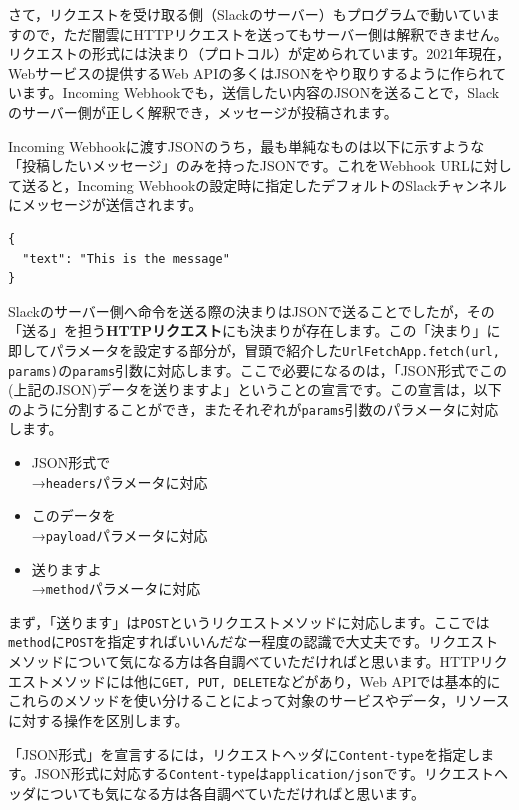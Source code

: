 \documentclass[uplatex,a4j]{jsarticle}
\begin{document}
さて，リクエストを受け取る側（Slackのサーバー）もプログラムで動いていますので，ただ闇雲にHTTPリクエストを送ってもサーバー側は解釈できません。リクエストの形式には決まり（プロトコル）が定められています。2021年現在，Webサービスの提供するWeb APIの多くはJSONをやり取りするように作られています。Incoming Webhookでも，送信したい内容のJSONを送ることで，Slackのサーバー側が正しく解釈でき，メッセージが投稿されます。


Incoming Webhookに渡すJSONのうち，最も単純なものは以下に示すような「投稿したいメッセージ」のみを持ったJSONです。これをWebhook URLに対して送ると，Incoming Webhookの設定時に指定したデフォルトのSlackチャンネルにメッセージが送信されます。
\begin{lstlisting}[basicstyle=\ttfamily\footnotesize,frame=single,caption=Minimum JSON payload for Incoming Webhook,label=jsonpayload]
{
  "text": "This is the message"
}
\end{lstlisting}

Slackのサーバー側へ命令を送る際の決まりはJSONで送ることでしたが，その「送る」を担う\textbf{HTTPリクエスト}にも決まりが存在します。この「決まり」に即してパラメータを設定する部分が，冒頭で紹介した\verb|UrlFetchApp.fetch(url, params)|の\verb|params|引数に対応します。ここで必要になるのは，「JSON形式でこの(上記のJSON)データを送りますよ」ということの宣言です。この宣言は，以下のように分割することができ，またそれぞれが\verb|params|引数のパラメータに対応します。

\begin{itemize}
\item JSON形式で\\
→\verb|headers|パラメータに対応
\item このデータを\\
→\verb|payload|パラメータに対応
\item 送りますよ\\
→\verb|method|パラメータに対応
\end{itemize}


まず，「送ります」は\verb|POST|というリクエストメソッドに対応します。ここでは\verb|method|に\verb|POST|を指定すればいいんだなー程度の認識で大丈夫です。リクエストメソッドについて気になる方は各自調べていただければと思います。HTTPリクエストメソッドには他に\verb|GET, PUT, DELETE|などがあり，Web APIでは基本的にこれらのメソッドを使い分けることによって対象のサービスやデータ，リソースに対する操作を区別します。


「JSON形式」を宣言するには，リクエストヘッダに\verb|Content-type|を指定します。JSON形式に対応する\verb|Content-type|は\verb|application/json|です。リクエストヘッダについても気になる方は各自調べていただければと思います。
\end{document}
